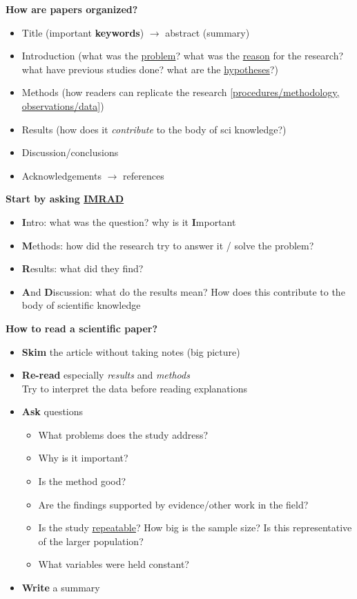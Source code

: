 \documentclass{article}
\begin{document}
\begin{multicols}{2}
\textbf{How are papers organized?}
\begin{itemize}
	\item Title (important \textbf{keywords}) $\rightarrow$ abstract (summary)
	\item Introduction (what was the \underline{problem}? what was the \underline{reason} for the research? what have previous studies done? what are the \underline{hypotheses}?)
	\item Methods (how readers can replicate the research [\underline{procedures/methodology, observations/data}])
	\item Results (how does it \textit{contribute} to the body of sci knowledge?)
	\item Discussion/conclusions
	\item Acknowledgements $\rightarrow$ references \\
\end{itemize}
\textbf{Start by asking \underline{IMRAD}}
\begin{itemize}
	\item \textbf{I}ntro: what was the question? why is it \textbf{I}mportant
	\item \textbf{M}ethods: how did the research try to answer it / solve the problem?
	\item \textbf{R}esults: what did they find?
	\item \textbf{A}nd \textbf{D}iscussion: what do the results mean? How does this contribute to the body of scientific knowledge
\end{itemize}
\textbf{How to read a scientific paper?}
\begin{itemize}
	\item \textbf{Skim} the article without taking notes (big picture)
	\item \textbf{Re-read} especially \textit{results} and \textit{methods}\\
	Try to interpret the data before reading explanations
	\item \textbf{Ask} questions
	\begin{itemize}
		\item What problems does the study address?
		\item Why is it important?
		\item Is the method good?
		\item Are the findings supported by evidence/other work in the field?
		\item Is the study \underline{repeatable}? How big is the sample size? Is this representative of the larger population?
		\item What variables were held constant?
	\end{itemize}
	\item \textbf{Write} a summary\\
\end{itemize}


\end{multicols}
\end{document}

